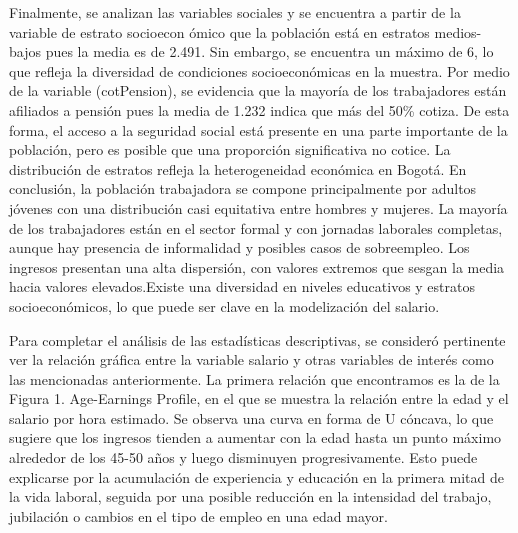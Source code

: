\documentclass[12pt,a4paper,onecolumn]{article}
\begin{document}
\begin{enumerate}
\begin{enumerate}
Finalmente, se analizan las variables sociales y se encuentra a partir de la variable de estrato socioecon \'omico que la poblaci\'on est\'a en estratos medios-bajos pues la media es de 2.491. Sin embargo, se encuentra un m\'aximo de 6, lo que refleja la diversidad de condiciones socioecon\'omicas en la muestra. Por medio de la variable (cotPension), se evidencia que la mayor\'ia de los trabajadores est\'an afiliados a pensi\'on pues la media de 1.232 indica que m\'as del 50\% cotiza. De esta forma, el acceso a la seguridad social est\'a presente en una parte importante de la poblaci\'on, pero es posible que una proporci\'on significativa no cotice. La distribuci\'on de estratos refleja la heterogeneidad econ\'omica en Bogot\'a. En conclusi\'on, la poblaci\'on trabajadora se compone principalmente por adultos j\'ovenes con una distribuci\'on casi equitativa entre hombres y mujeres. La mayor\'ia de los trabajadores est\'an en el sector formal y con jornadas laborales completas, aunque hay presencia de informalidad y posibles casos de sobreempleo. Los ingresos presentan una alta dispersi\'on, con valores extremos que sesgan la media hacia valores elevados.Existe una diversidad en niveles educativos y estratos socioecon\'omicos, lo que puede ser clave en la modelizaci\'on del salario.

Para completar el an\'alisis de las estad\'isticas descriptivas, se consider\'o pertinente ver la relaci\'on gr\'afica entre la variable salario y otras variables de inter\'es como las mencionadas anteriormente. La primera relaci\'on que encontramos es la de la Figura 1. Age-Earnings Profile, en el que se muestra la relaci\'on entre la edad y el salario por hora estimado. Se observa una curva en forma de U c\'oncava, lo que sugiere que los ingresos tienden a aumentar con la edad hasta un punto m\'aximo alrededor de los 45-50 a\~nos y luego disminuyen progresivamente. Esto puede explicarse por la acumulaci\'on de experiencia y educaci\'on en la primera mitad de la vida laboral, seguida por una posible reducci\'on en la intensidad del trabajo, jubilaci\'on o cambios en el tipo de empleo en una edad mayor. 


\end{enumerate}
\end{enumerate}
\end{document}
